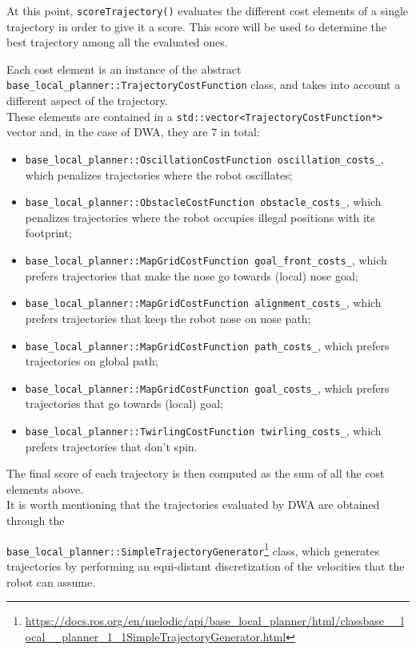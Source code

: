 \documentclass[11pt,a4paper]{article}
\begin{document}
At this point, \texttt{scoreTrajectory()} evaluates the different cost elements of a single trajectory in order to
give it a score. This score will be used to determine the best trajectory among all the evaluated ones.

Each cost element is an instance of the abstract \texttt{base\_local\_planner::TrajectoryCostFunction} class,
and takes into account a different aspect of the trajectory.\\

These elements are contained in a \texttt{std::vector<TrajectoryCostFunction*>} vector and, in the case
of DWA, they are 7 in total:

\begin{itemize}
    \item \texttt{base\_local\_planner::OscillationCostFunction oscillation\_costs\_},
            which penalizes trajectories where the robot oscillates;
    \item \texttt{base\_local\_planner::ObstacleCostFunction obstacle\_costs\_},
            which penalizes trajectories where the robot occupies illegal positions with its footprint;
    \item \texttt{base\_local\_planner::MapGridCostFunction goal\_front\_costs\_},
            which prefers  trajectories that make the nose go towards (local) nose goal;
    \item \texttt{base\_local\_planner::MapGridCostFunction alignment\_costs\_},
            which prefers trajectories that keep the robot nose on nose path;
    \item \texttt{base\_local\_planner::MapGridCostFunction path\_costs\_},
            which prefers trajectories on global path;
    \item \texttt{base\_local\_planner::MapGridCostFunction goal\_costs\_},
            which prefers trajectories that go towards (local) goal;
    \item \texttt{base\_local\_planner::TwirlingCostFunction twirling\_costs\_},
            which prefers trajectories that don't spin.\\
\end{itemize}

The final score of each trajectory is then computed as the sum of all the cost elements above.\\

It is worth mentioning that the trajectories evaluated by DWA are obtained through the

\texttt{base\_local\_planner::SimpleTrajectoryGenerator}\footnote
{\href{https://docs.ros.org/en/melodic/api/base\_local\_planner/html/classbase\_\_local\_\_planner\_1\_1SimpleTrajectoryGenerator.html}
{https://docs.ros.org/en/melodic/api/base\_local\_planner/html/classbase\_\_local\_\_planner\_1\_1SimpleTrajectoryGenerator.html}}
class, which generates trajectories by performing an equi-distant discretization of the velocities that
the robot can assume.\\
\end{document}

